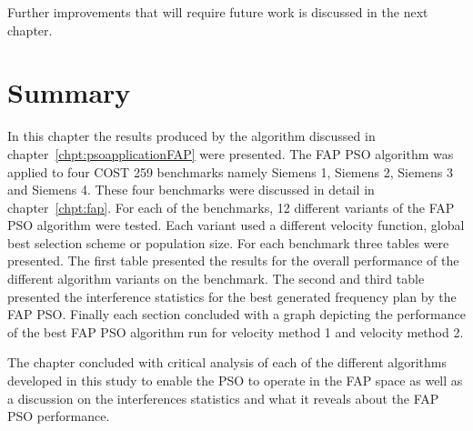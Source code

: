 Further improvements that will require future work is discussed in the next chapter.

\section{Summary}
In this chapter the results produced by the algorithm discussed in chapter~\ref{chpt:psoapplicationFAP} were presented. The FAP PSO algorithm was applied to four COST 259 benchmarks namely Siemens 1, Siemens 2, Siemens 3 and Siemens 4. These four benchmarks were discussed in detail in chapter~\ref{chpt:fap}. For each of the benchmarks, 12 different variants of the FAP PSO algorithm were tested. Each variant used a different velocity function, global best selection scheme or population size. For each benchmark three tables were presented. The first table presented the results for the overall performance of the different algorithm variants on the benchmark. The second and third table presented the interference statistics for the best generated frequency plan by the FAP PSO. Finally each section concluded with a graph depicting the performance of the best FAP PSO algorithm run for velocity method 1 and velocity method 2.

The chapter concluded with critical analysis of each of the different algorithms developed in this study to enable the PSO to operate in the FAP space as well as a discussion on the interferences statistics and what it reveals about the FAP PSO performance.
